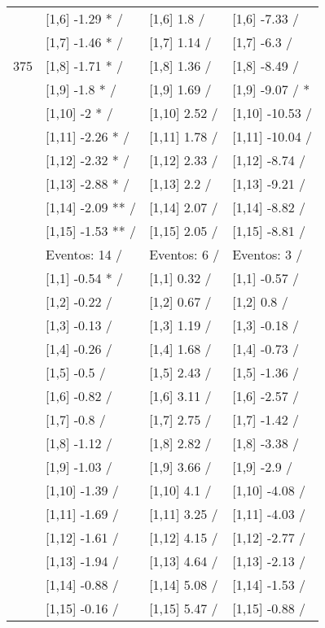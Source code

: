 \begin{table}
\begin{tabular}[t]{llll}
 & {}[1,6] -1.29 * / & {}[1,6] 1.8  / & {}[1,6] -7.33  /\\
 & {}[1,7] -1.46 * / & {}[1,7] 1.14  / & {}[1,7] -6.3  /\\
375 & {}[1,8] -1.71 * / & {}[1,8] 1.36  / & {}[1,8] -8.49  /\\
\addlinespace
 & {}[1,9] -1.8 * / & {}[1,9] 1.69  / & {}[1,9] -9.07  / *\\
 & {}[1,10] -2 * / & {}[1,10] 2.52  / & {}[1,10] -10.53  /\\
 & {}[1,11] -2.26 * / & {}[1,11] 1.78  / & {}[1,11] -10.04  /\\
 & {}[1,12] -2.32 * / & {}[1,12] 2.33  / & {}[1,12] -8.74  /\\
 & {}[1,13] -2.88 * / & {}[1,13] 2.2  / & {}[1,13] -9.21  /\\
\addlinespace
 & {}[1,14] -2.09 ** / & {}[1,14] 2.07  / & {}[1,14] -8.82  /\\
 & {}[1,15] -1.53 ** / & {}[1,15] 2.05  / & {}[1,15] -8.81  /\\
 & Eventos:  14 / & Eventos:  6 / & Eventos:  3 /\\
 & {}[1,1] -0.54 * / & {}[1,1] 0.32  / & {}[1,1] -0.57  /\\
 & {}[1,2] -0.22  / & {}[1,2] 0.67  / & {}[1,2] 0.8  /\\
\addlinespace
 & {}[1,3] -0.13  / & {}[1,3] 1.19  / & {}[1,3] -0.18  /\\
 & {}[1,4] -0.26  / & {}[1,4] 1.68  / & {}[1,4] -0.73  /\\
 & {}[1,5] -0.5  / & {}[1,5] 2.43  / & {}[1,5] -1.36  /\\
 & {}[1,6] -0.82  / & {}[1,6] 3.11  / & {}[1,6] -2.57  /\\
 & {}[1,7] -0.8  / & {}[1,7] 2.75  / & {}[1,7] -1.42  /\\
\addlinespace
500 & {}[1,8] -1.12  / & {}[1,8] 2.82  / & {}[1,8] -3.38  /\\
 & {}[1,9] -1.03  / & {}[1,9] 3.66  / & {}[1,9] -2.9  /\\
 & {}[1,10] -1.39  / & {}[1,10] 4.1  / & {}[1,10] -4.08  /\\
 & {}[1,11] -1.69  / & {}[1,11] 3.25  / & {}[1,11] -4.03  /\\
 & {}[1,12] -1.61  / & {}[1,12] 4.15  / & {}[1,12] -2.77  /\\
\addlinespace
 & {}[1,13] -1.94  / & {}[1,13] 4.64  / & {}[1,13] -2.13  /\\
 & {}[1,14] -0.88  / & {}[1,14] 5.08  / & {}[1,14] -1.53  /\\
 & {}[1,15] -0.16  / & {}[1,15] 5.47  / & {}[1,15] -0.88  /\\
\bottomrule
\end{tabular}
\end{table}
